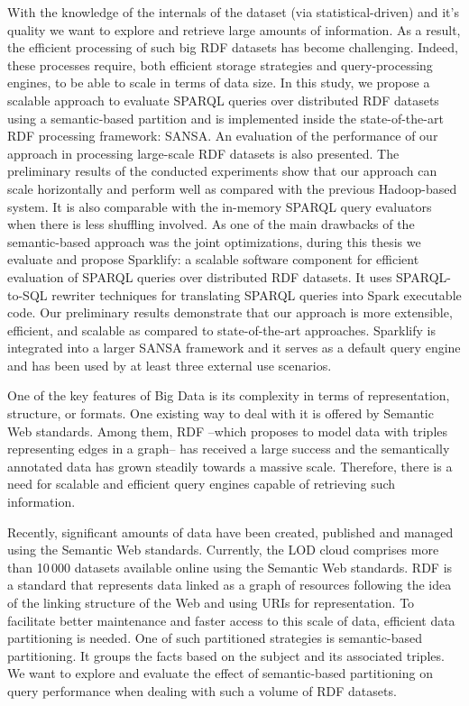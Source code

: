With the knowledge of the internals of the dataset (via statistical-driven) and it's quality we want to explore and retrieve large amounts of information.
As a result, the efficient processing of such big RDF datasets has become challenging.
Indeed, these processes require, both efficient storage strategies and query-processing engines, to be able to scale in terms of data size.
In this study, we propose a scalable approach to evaluate SPARQL queries over distributed RDF datasets using a semantic-based partition and is implemented inside the state-of-the-art RDF processing framework: SANSA.
An evaluation of the performance of our approach in processing large-scale RDF datasets is also presented. 
The preliminary results of the conducted experiments show that our approach can scale horizontally and perform well as compared with the previous Hadoop-based system.
It is also comparable with the in-memory SPARQL query evaluators when there is less shuffling involved.
As one of the main drawbacks of the semantic-based approach was the joint optimizations, during this thesis we evaluate and propose Sparklify: a scalable software component for efficient evaluation of SPARQL queries over distributed RDF datasets. 
It uses SPARQL-to-SQL rewriter techniques for translating SPARQL queries into Spark executable code.
Our preliminary results demonstrate that our approach is more extensible, efficient, and scalable as compared to state-of-the-art approaches.
Sparklify is integrated into a larger SANSA framework and it serves as a default query engine and has been used by at least three external use scenarios.



One of the key features of Big Data is its complexity in terms of representation, structure, or formats.
One existing way to deal with it is offered by Semantic Web standards.
Among them, \gls{RDF} --which proposes to model data with triples representing edges in a graph-- has received a large success and the semantically annotated data has grown steadily towards a massive scale.
Therefore, there is a need for scalable and efficient query engines capable of retrieving such information.

Recently, significant amounts of data have been created, published and managed using the Semantic Web standards.
Currently, the \gls{LOD} cloud comprises more than 10\,000 datasets available online using the Semantic Web standards. 
\gls{RDF} is a standard that represents data linked as a graph of resources following the idea of the linking structure of the Web and using \gls{URI}s for representation.
To facilitate better maintenance and faster access to this scale of data, efficient data partitioning is needed.
One of such partitioned strategies is semantic-based partitioning. 
It groups the facts based on the subject and its associated triples.
We want to explore and evaluate the effect of semantic-based partitioning on query performance when dealing with such a volume of \gls{RDF} datasets.

